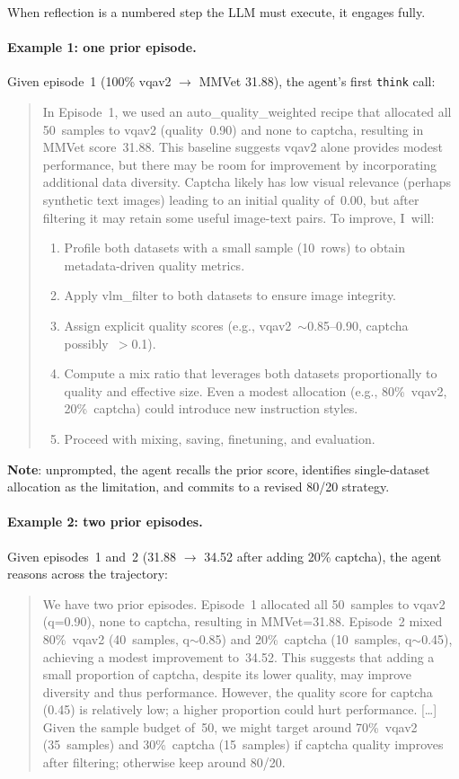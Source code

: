 \newpage
\noindent When reflection is a numbered step the LLM must execute, it engages fully.

\paragraph{Example 1: one prior episode.}
Given episode~1 (100\% vqav2 $\to$ MMVet 31.88), the agent's first \texttt{think} call:

\begin{quote}
\small\ttfamily
In Episode~1, we used an auto\_quality\_weighted recipe that allocated all 50~samples to vqav2 (quality~0.90) and none to captcha, resulting in MMVet score~31.88.
This baseline suggests vqav2 alone provides modest performance, but there may be room for improvement by incorporating additional data diversity.
Captcha likely has low visual relevance (perhaps synthetic text images) leading to an initial quality of~0.00, but after filtering it may retain some useful image-text pairs.
To improve, I~will:
\begin{enumerate}
\item Profile both datasets with a small sample (10~rows) to obtain metadata-driven quality metrics.
\item Apply vlm\_filter to both datasets to ensure image integrity.
\item Assign explicit quality scores (e.g., vqav2~$\sim$0.85--0.90, captcha possibly~$>$0.1).
\item Compute a mix ratio that leverages both datasets proportionally to quality and effective size. Even a modest allocation (e.g., 80\%~vqav2, 20\%~captcha) could introduce new instruction styles.
\item Proceed with mixing, saving, finetuning, and evaluation.
\end{enumerate}
\end{quote}

\noindent \textbf{Note}: unprompted, the agent recalls the prior score, identifies single-dataset allocation as the limitation, and commits to a revised 80/20 strategy.

\paragraph{Example 2: two prior episodes.}
Given episodes~1 and~2 (31.88 $\to$ 34.52 after adding 20\% captcha), the agent reasons across the trajectory:

\begin{quote}
\small\ttfamily
We have two prior episodes.
Episode~1 allocated all 50~samples to vqav2 (q=0.90), none to captcha, resulting in MMVet=31.88.
Episode~2 mixed 80\%~vqav2 (40~samples, q$\sim$0.85) and 20\%~captcha (10~samples, q$\sim$0.45), achieving a modest improvement to~34.52.
This suggests that adding a small proportion of captcha, despite its lower quality, may improve diversity and thus performance.
However, the quality score for captcha (0.45) is relatively low; a higher proportion could hurt performance.
[\ldots]
Given the sample budget of~50, we might target around 70\%~vqav2 (35~samples) and 30\%~captcha (15~samples) if captcha quality improves after filtering; otherwise keep around 80/20.
\end{quote}

